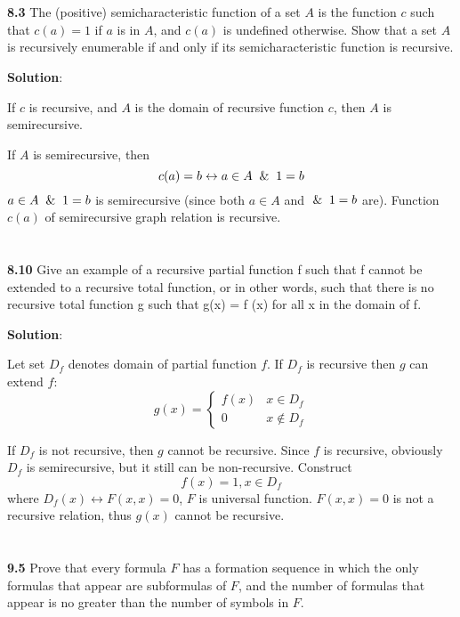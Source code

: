 \documentclass{ctexart}
\begin{document}
\section*{}
\textbf{8.3} The (positive) semicharacteristic function of a set $A$ is the function $c$ such
that $c(a) = 1$ if $a$ is in $A$, and $c(a)$ is undefined otherwise. Show that a set $A$ is
recursively enumerable if and only if its semicharacteristic function is recursive.

\textbf{Solution}:

If $c$ is recursive, and $A$ is the domain of recursive function $c$, then $A$ is semirecursive.

If $A$ is semirecursive, then
$$
c(a) = b \leftrightarrow a \in A \And 1 = b
$$
$a \in A \And 1 = b$ is semirecursive (since both $a \in A$ and $\And 1 = b$ are). Function $c(a)$
of semirecursive graph relation is recursive.

\section*{}
\textbf{8.10} Give an example of a recursive partial function f such that f
cannot be extended to a recursive total function, or in other words, such that there is no
recursive total function g such that g(x) = f (x) for all x in the domain of f.

\textbf{Solution}:

Let set $D_f$ denotes domain of partial function $f$. If $D_f$ is recursive
then $g$ can extend $f$:
$$
g(x) = \begin{cases}
	f(x) & x \in D_f \\
	0 & x \not\in D_f
\end{cases}
$$

If $D_f$ is not recursive, then $g$ cannot be recursive. Since $f$ is recursive,
obviously $D_f$ is semirecursive, but it still can be non-recursive. Construct
$$
f(x) = 1, x \in D_f
$$
where $D_f(x) \leftrightarrow F(x, x) = 0$, $F$ is universal function. $F(x, x) = 0$ is not a
recursive relation, thus $g(x)$ cannot be recursive.

\section*{}
\textbf{9.5} Prove that every formula $F$ has a formation sequence in which the only formulas
that appear are subformulas of $F$, and the number of formulas that appear is no greater than
the number of symbols in $F$.
\end{document}
